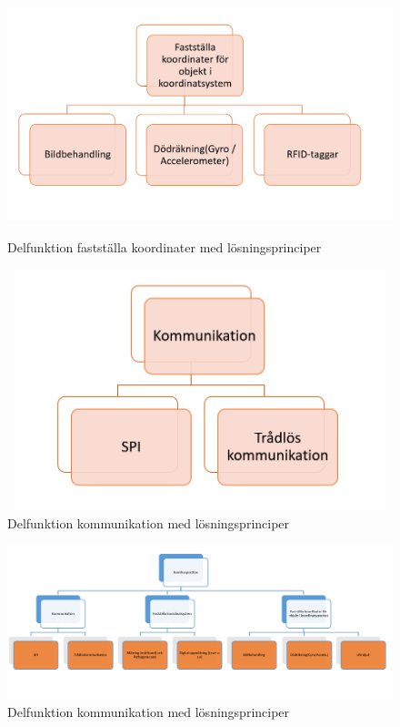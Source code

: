 \documentclass[11pt, a4paper]{report}
\begin{document}
\begin{figure}[H]
	\begin{center}
		\includegraphics [width=12cm, height=7cm, angle=0]{objekt.PNG}
		\caption{Delfunktion fastställa koordinater med lösningsprinciper}
		\label{fig:objekt}
	\end{center}
\end{figure}


\begin{figure}[H]
	\begin{center}
		\includegraphics [width=12cm,height=7cm,angle=0]{kommunikation.png}
		\caption{Delfunktion kommunikation med lösningsprinciper}
		\label{fig:kommunikation}
	\end{center}
\end{figure}


\begin{figure}[H]
	\begin{center}
		\includegraphics [width=12cm,angle=0]{funktionmedel.png}
		\caption{Delfunktion kommunikation med lösningsprinciper}
		\label{fig:funktionmedel}
	\end{center}
\end{figure}
\end{document}
